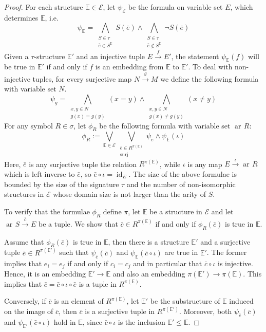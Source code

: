 \documentclass[10pt,a4paper]{amsart}
\DeclareMathOperator{\ar}{ar\!}
\DeclareMathOperator{\id}{id}
\newcommand{\cat}[1]{\mathcal{#1}}
\newcommand{\str}[1]{\mathbb{#1}}
\begin{document}
\begin{proof}
    For each structure $\str E\in\cat E$, let $\psi_{\cat E}$ be the formula on variable set $E$, which determines $\str E$, i.e.
    $$
    \psi_{\str E} = 
    \bigwedge_{\substack{S\in\tau\\ \bar{e}\in S^{\str E}}} S(\bar{e}) \wedge
    \bigwedge_{\substack{S\in\tau\\ \bar{e}\notin S^{\str E}}} \neg S(\bar{e})
    $$
    Given a $\tau$-structure $\str E'$ and an injective tuple $E\xrightarrow{f}E'$, the statement $\psi_{\str E}(f)$ will be true in $\str E'$ if and only if $f$ is an embedding from $\str E$ to $\str E'$. To deal with non-injective tuples, for every surjective map $N\xrightarrow{g}M$ we define the following formula with variable set $N$.
    $$
    \psi_g =
    \bigwedge_{\substack{x,y\in N\\ g(x)= g(y)}} (x = y) \wedge
    \bigwedge_{\substack{x,y\in N\\ g(x)\neq g(y)}} (x \neq y)
    $$
    For any symbol $R\in\sigma$, let $\phi_R$ be the following formula with variable set $\ar R$:
    $$
    \phi_R :=
    \bigvee_{\str E\in\cat E}
    \bigvee_{\substack{\bar{e}\in R^{\pi(\str E)} \\ \text{surj}}}
    \psi_{\bar{e}}\wedge \psi_{\str E}(\iota)
    $$
    Here, $\bar{e}$ is any surjective tuple the relation $R^{\pi(\str E)}$, while $\iota$ is any map $E\xrightarrow{\iota}\ar R$ which is left inverse to $\bar{e}$, so $\bar{e}\circ\iota=\id_{E}$. The size of the above formulae is bounded by the size of the signature $\tau$ and the number of non-isomorphic structures in $\cat E$ whose domain size is not larger than the arity of $S$.
    
    To verify that the formulae $\phi_R$ define $\pi$, let $\str E$ be a structure in $\cat E$ and let $\ar S\xrightarrow{\bar{c}} E$ be a tuple. We show that $\bar{c}\in R^{\pi(\str E)}$ if and only if $\phi_R(\bar{c})$ is true in $\str E$.
    
    Assume that $\phi_R(\bar{c})$ is true in $\str E$, then there is a structure $\str E'$ and a surjective tuple $\bar{e}\in R^{\pi(\str E')}$ such that $\psi_{\bar{e}}(\bar{c})$ and $\psi_{\str E}({\bar{c}\circ\iota})$ are true in $\str E'$. The former implies that $e_i=e_j$ if and only if $c_i=c_j$ and in particular that $\bar{c}\circ\iota$ is injective. Hence, it is an embedding $\str E'\xrightarrow{}\str E$ and also an embedding $\pi(\str E')\xrightarrow{}\pi(\str E)$. This implies that $\bar{c}=\bar{c}\circ\iota\circ\bar{e}$ is a tuple in $R^{\pi(\str E)}$.

    Conversely, if $\bar{c}$ is an element of $R^{\pi(\str E)}$, let $\str E'$ be the substructure of $\str E$ induced on the image of $\bar{c}$, then $\bar{c}$ is a surjective tuple in $R^{\pi(\str E')}$. Moreover, both $\psi_{\bar{c}}(\bar{c})$ and $\psi_{\str E'}(\bar{c}\circ\iota)$ hold in $\str E$, since $\bar{c}\circ\iota$ is the inclusion $\str E'\leq \str E$.
\end{proof}
\end{document}
